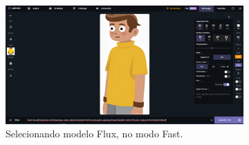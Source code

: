\begin{figure}[htbp]
    \centering
    \caption{\small Processo da utilização 3 do CGDream (Imagem)}
    \label{fig:cgDream3}
    \begin{subfigure}{0.9\linewidth}
        \includegraphics[width=1\linewidth]{figs/cgDream/tela_img_FluxFast1.PNG}
        \caption{\small Selecionando modelo Flux, no modo Fast.}
        \label{fig:cgDream3a}
    \end{subfigure}
    \begin{subfigure}{0.15\linewidth}

\end{subfigure}
\end{figure}
